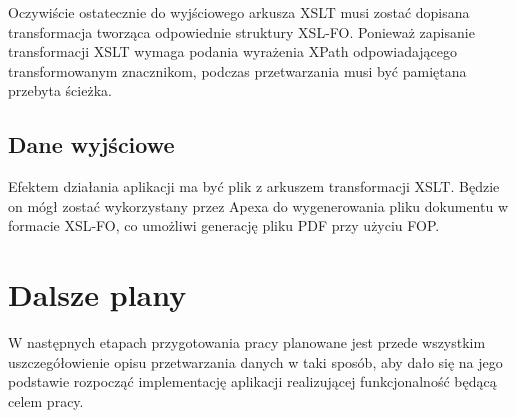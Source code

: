 \documentclass[11pt,a4paper]{article}
\begin{document}
Oczywiście ostatecznie do wyjściowego arkusza XSLT musi zostać dopisana transformacja tworząca odpowiednie struktury XSL-FO. Ponieważ zapisanie transformacji XSLT wymaga podania wyrażenia XPath odpowiadającego transformowanym znacznikom, podczas przetwarzania musi być pamiętana przebyta ścieżka.

\subsection{Dane wyjściowe}\label{sec:appOutput}
 Efektem działania aplikacji ma być plik z arkuszem transformacji XSLT. Będzie on mógł zostać wykorzystany przez Apexa do wygenerowania pliku dokumentu w formacie XSL-FO, co umożliwi generację pliku PDF przy użyciu FOP.

\section{Dalsze plany}\label{sec:plany}
W następnych etapach przygotowania pracy planowane jest przede wszystkim uszczegółowienie opisu przetwarzania danych w taki sposób, aby dało się na jego podstawie rozpocząć implementację aplikacji realizującej funkcjonalność będącą celem pracy. 
\end{document}
